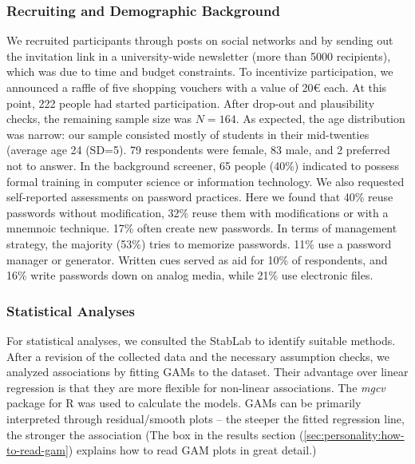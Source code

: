 \subsubsection{Recruiting and Demographic Background}
We recruited participants through posts on social networks and by sending out the invitation link in a university-wide newsletter (more than 5000 recipients), which was due to time and budget constraints. To incentivize participation, we announced a raffle of five shopping vouchers with a value of 20€ each. At this point, 222 people had started participation. After drop-out and plausibility checks, the remaining sample size was $N=164$. As expected, the age distribution was narrow: our sample consisted mostly of students in their mid-twenties (average age 24 (SD=5). 79 respondents were female, 83 male, and 2 preferred not to answer. In the background screener, 65 people (40\%) indicated to possess formal training in computer science or information technology. We also requested self-reported assessments on password practices. Here we found that 40\% reuse passwords without modification, 32\% reuse them with modifications or with a mnemnoic technique. 17\% often create new passwords. In terms of management strategy, the majority (53\%) tries to memorize passwords. 11\% use a password manager or generator. Written cues served as aid for 10\% of respondents, and 16\% write passwords down on analog media, while 21\% use electronic files. %

\subsubsection{Statistical Analyses}
For statistical analyses, we consulted the StabLab to identify suitable methods. After a revision of the collected data and the necessary assumption checks, we analyzed associations by fitting \glspl{GAM} to the dataset. Their advantage over linear regression is that they are more flexible for non-linear associations. The \textit{mgcv} package for R was used to calculate the models. GAMs can be primarily interpreted through residual/smooth plots -- the steeper the fitted regression line, the stronger the association (The box in the results section  (\ref{sec:personality:how-to-read-gam}) explains how to read GAM plots in great detail.)

